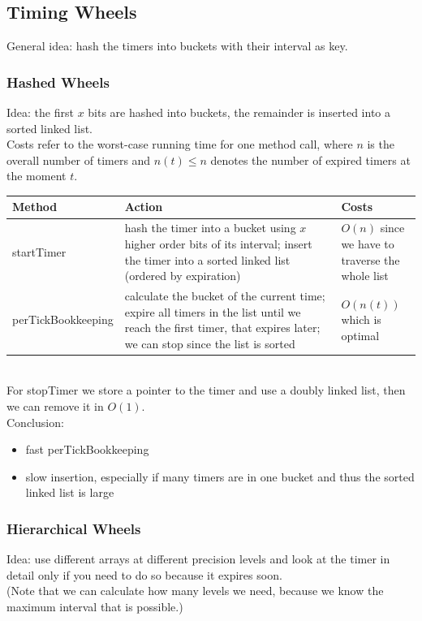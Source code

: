 \subsection{Timing Wheels}

General idea: hash the timers into buckets with their interval as key.

\subsubsection{Hashed Wheels}

Idea: the first $x$ bits are hashed into buckets, the remainder is inserted into a sorted linked list.\\

Costs refer to the worst-case running time for one method call, where $n$ is the overall number of timers and $n(t) \leq n$ denotes the number of expired timers at the moment $t$.\\
\begin{tabular}{p{0.2\linewidth}|p{0.6\linewidth}|p{0.2\linewidth}}
Method & Action & Costs \\
\hline \hline
startTimer & hash the timer into a bucket using $x$ higher order bits of its interval; insert the timer into a sorted linked list (ordered by expiration) & $O(n)$ since we have to traverse the whole list\\
perTickBookkeeping & calculate the bucket of the current time; expire all timers in the list until we reach the first timer, that expires later; we can stop since the list is sorted & $O(n(t))$ which is optimal \\
\end{tabular}\\
For stopTimer we store a pointer to the timer and use a doubly linked list, then we can remove it in $O(1)$.\\

Conclusion: 
\begin{itemize}
\item fast perTickBookkeeping
\item slow insertion, especially if many timers are in one bucket and thus the sorted linked list is large
\end{itemize}

\subsubsection{Hierarchical Wheels}

Idea: use different arrays at different precision levels and look at the timer in detail only if you need to do so because it expires soon.\\
(Note that we can calculate how many levels we need, because we know the maximum interval that is possible.)\\

